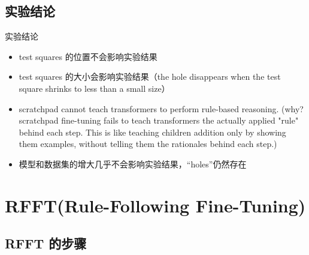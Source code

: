 \documentclass[aspectratio=169]{beamer}
\begin{document}
\subsection{实验结论}
\begin{frame}{实验结论} 
    \begin{itemize}
        \item test squares 的位置不会影响实验结果
        \pause
        \item test squares 的大小会影响实验结果（the hole disappears when the test square shrinks to less than a small size）
        \pause
        \item scratchpad cannot teach transformers to perform rule-based reasoning. (why? scratchpad fine-tuning fails to teach transformers the actually applied "rule" behind each step. This is like teaching children addition only by showing them examples, without telling them the rationales behind each step.)
        \pause
        \item 模型和数据集的增大几乎不会影响实验结果，“holes”仍然存在
    \end{itemize}
\end{frame}

\section{RFFT(Rule-Following Fine-Tuning)}

\subsection{RFFT 的步骤}
\end{document}
